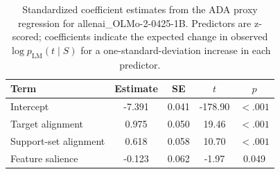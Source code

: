 \begin{table}

\caption{\label{tab:ada-coefficients-allenai-olmo-2-0425-1b}Standardized coefficient estimates from the ADA proxy regression for allenai_OLMo-2-0425-1B. Predictors are z-scored; coefficients indicate the expected change in observed $\log p_{\mathrm{LM}}(t \mid S)$ for a one-standard-deviation increase in each predictor.}
\centering
\begin{tabular}[t]{lcccc}
\toprule
Term & Estimate & SE & $t$ & $p$\\
\midrule
Intercept & -7.391 & 0.041 & -178.90 & $< .001$\\
Target alignment & 0.975 & 0.050 & 19.46 & $< .001$\\
Support-set alignment & 0.618 & 0.058 & 10.70 & $< .001$\\
Feature salience & -0.123 & 0.062 & -1.97 & 0.049\\
\bottomrule
\end{tabular}
\end{table}
